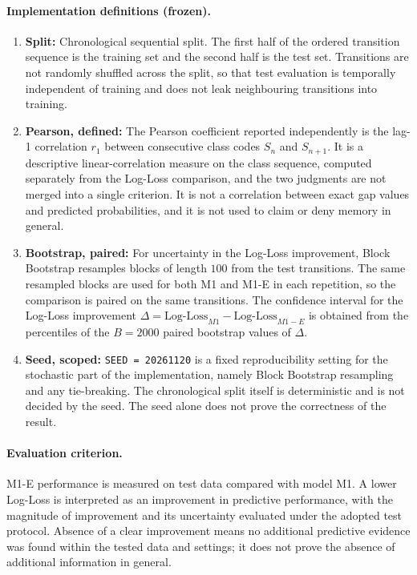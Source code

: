 \documentclass[12pt,a4paper]{article}
\begin{document}
\paragraph{Implementation definitions (frozen).}
\begin{enumerate}
    \item \textbf{Split:} Chronological sequential split. The first half of the ordered transition sequence is the training set and the second half is the test set. Transitions are not randomly shuffled across the split, so that test evaluation is temporally independent of training and does not leak neighbouring transitions into training.
    \item \textbf{Pearson, defined:} The Pearson coefficient reported independently is the lag-1 correlation $r_1$ between consecutive class codes $S_n$ and $S_{n+1}$. It is a descriptive linear-correlation measure on the class sequence, computed separately from the Log-Loss comparison, and the two judgments are not merged into a single criterion. It is not a correlation between exact gap values and predicted probabilities, and it is not used to claim or deny memory in general.
    \item \textbf{Bootstrap, paired:} For uncertainty in the Log-Loss improvement, Block Bootstrap resamples blocks of length $100$ from the test transitions. The same resampled blocks are used for both M1 and M1-E in each repetition, so the comparison is paired on the same transitions. The confidence interval for the Log-Loss improvement $\Delta = \text{Log-Loss}_{M1} - \text{Log-Loss}_{M1-E}$ is obtained from the percentiles of the $B=2000$ paired bootstrap values of $\Delta$.
    \item \textbf{Seed, scoped:} \texttt{SEED = 20261120} is a fixed reproducibility setting for the stochastic part of the implementation, namely Block Bootstrap resampling and any tie-breaking. The chronological split itself is deterministic and is not decided by the seed. The seed alone does not prove the correctness of the result.
\end{enumerate}
\paragraph{Evaluation criterion.}
M1-E performance is measured on test data compared with model M1. A lower Log-Loss is interpreted as an improvement in predictive performance, with the magnitude of improvement and its uncertainty evaluated under the adopted test protocol. Absence of a clear improvement means no additional predictive evidence was found within the tested data and settings; it does not prove the absence of additional information in general.
\end{document}
